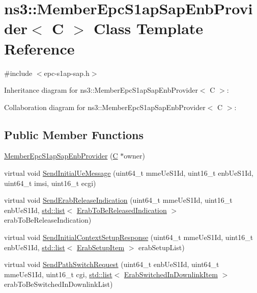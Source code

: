 \hypertarget{classns3_1_1MemberEpcS1apSapEnbProvider}{}\section{ns3\+:\+:Member\+Epc\+S1ap\+Sap\+Enb\+Provider$<$ C $>$ Class Template Reference}
\label{classns3_1_1MemberEpcS1apSapEnbProvider}


{\ttfamily \#include $<$epc-\/s1ap-\/sap.\+h$>$}



Inheritance diagram for ns3\+:\+:Member\+Epc\+S1ap\+Sap\+Enb\+Provider$<$ C $>$\+:


Collaboration diagram for ns3\+:\+:Member\+Epc\+S1ap\+Sap\+Enb\+Provider$<$ C $>$\+:
\subsection*{Public Member Functions}
\begin{DoxyCompactItemize}
\item 
\hyperlink{classns3_1_1MemberEpcS1apSapEnbProvider_a6494aac045d74829d0d956380593f136}{Member\+Epc\+S1ap\+Sap\+Enb\+Provider} (\hyperlink{loss__COST231__small__cities__urban_8m_aaa53ca0b650dfd85c4f59fa156f7a2cc}{C} $\ast$owner)
\item 
virtual void \hyperlink{classns3_1_1MemberEpcS1apSapEnbProvider_ab84c773694321e31d3bde1a5744c3a67}{Send\+Initial\+Ue\+Message} (uint64\+\_\+t mme\+Ue\+S1\+Id, uint16\+\_\+t enb\+Ue\+S1\+Id, uint64\+\_\+t imsi, uint16\+\_\+t ecgi)
\item 
virtual void \hyperlink{classns3_1_1MemberEpcS1apSapEnbProvider_af6085f49b45ee6856b4e39654501444c}{Send\+Erab\+Release\+Indication} (uint64\+\_\+t mme\+Ue\+S1\+Id, uint16\+\_\+t enb\+Ue\+S1\+Id, \hyperlink{openflow-interface_8h_afd9bcfa176617760671b67580f536fa7}{std\+::list}$<$ \hyperlink{structns3_1_1EpcS1apSap_1_1ErabToBeReleasedIndication}{Erab\+To\+Be\+Released\+Indication} $>$ erab\+To\+Be\+Release\+Indication)
\item 
virtual void \hyperlink{classns3_1_1MemberEpcS1apSapEnbProvider_a491831a41ce19bbc4ab45b32567b2eca}{Send\+Initial\+Context\+Setup\+Response} (uint64\+\_\+t mme\+Ue\+S1\+Id, uint16\+\_\+t enb\+Ue\+S1\+Id, \hyperlink{openflow-interface_8h_afd9bcfa176617760671b67580f536fa7}{std\+::list}$<$ \hyperlink{structns3_1_1EpcS1apSap_1_1ErabSetupItem}{Erab\+Setup\+Item} $>$ erab\+Setup\+List)
\item 
virtual void \hyperlink{classns3_1_1MemberEpcS1apSapEnbProvider_ab73f131c0377d951b876f001f16b172a}{Send\+Path\+Switch\+Request} (uint64\+\_\+t enb\+Ue\+S1\+Id, uint64\+\_\+t mme\+Ue\+S1\+Id, uint16\+\_\+t cgi, \hyperlink{openflow-interface_8h_afd9bcfa176617760671b67580f536fa7}{std\+::list}$<$ \hyperlink{structns3_1_1EpcS1apSap_1_1ErabSwitchedInDownlinkItem}{Erab\+Switched\+In\+Downlink\+Item} $>$ erab\+To\+Be\+Switched\+In\+Downlink\+List)
\end{DoxyCompactItemize}
